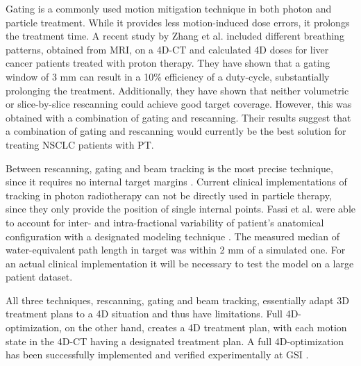 
Gating is a commonly used motion mitigation technique in both photon and particle treatment. While it provides less motion-induced dose errors, it prolongs the treatment time.
A recent study by Zhang et al. \cite{Zhang2015} included 
different breathing patterns, obtained from MRI, on a 4D-CT and calculated 4D doses for liver cancer patients treated with proton therapy. They have shown that a gating window of 3 mm can result
in a 10\% efficiency of a duty-cycle, 
substantially prolonging the treatment. Additionally, they have shown that neither volumetric or slice-by-slice rescanning could achieve good target coverage.
However, this was obtained with a combination
of gating and rescanning. Their results suggest that a combination of gating and rescanning would currently be the best solution for treating NSCLC patients with PT.

Between rescanning, gating and beam tracking is the most precise technique, since it requires no internal target margins \cite{Bert2011}. 
Current clinical implementations of tracking in photon radiotherapy \cite{Kilby2010, Keall2014} can not be directly used in particle therapy, 
since they only provide the position of single internal points. Fassi et al. 
\cite{Fassi2015} were able to account for inter- and intra-fractional variability of patient's anatomical configuration with a designated modeling technique \cite{Fassi2014}.
The measured median of water-equivalent path length in target was within 2 mm of a simulated one. For an actual clinical implementation it will be necessary to test the model
on a large patient dataset.

All three techniques, rescanning, gating and beam tracking, essentially adapt 3D treatment plans to a 4D situation and thus have limitations. Full 4D-optimization, on the other hand,
creates a 4D treatment plan, with each motion state in the 4D-CT having a designated treatment plan. A full 4D-optimization has been successfully implemented and verified experimentally at
GSI \cite{Graeff2013}.

